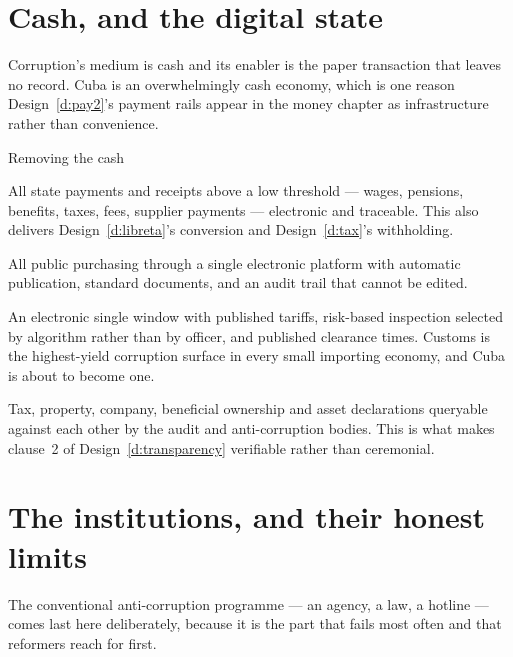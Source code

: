 \section{Cash, and the digital state}

Corruption's medium is cash and its enabler is the paper transaction that leaves
no record. Cuba is an overwhelmingly cash economy, which is one reason
Design~\ref{d:pay2}'s payment rails appear in the money chapter as
infrastructure rather than convenience.

\begin{design}{Removing the cash}
\label{d:digital}
\begin{rules}
 All state payments and receipts above a low
threshold --- wages, pensions, benefits, taxes, fees, supplier payments ---
electronic and traceable. This also delivers Design~\ref{d:libreta}'s conversion
and Design~\ref{d:tax}'s withholding.

 All public purchasing through a single electronic
platform with automatic publication, standard documents, and an audit trail that
cannot be edited.

 An electronic single window with published tariffs, risk-based
inspection selected by algorithm rather than by officer, and published clearance
times. Customs is the highest-yield corruption surface in every small importing
economy, and Cuba is about to become one.

 Tax, property, company, beneficial ownership and
asset declarations queryable against each other by the audit and anti-corruption
bodies. This is what makes clause~2 of Design~\ref{d:transparency} verifiable
rather than ceremonial.
\end{rules}
\end{design}

\section{The institutions, and their honest limits}

The conventional anti-corruption programme --- an agency, a law, a hotline ---
comes last here deliberately, because it is the part that fails most often and
that reformers reach for first.

